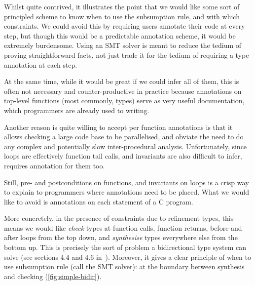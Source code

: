 Whilst quite contrived, it illustrates the point that we would like some sort
of principled scheme to know when to use the subsumption rule, and with which
constraints. We could avoid this by requiring users annotate their code at
every step, but though this would be a predictable annotation scheme, it would
be extremely burdensome. Using an SMT solver is meant to reduce the tedium of
proving straightforward facts, not just trade it for the tedium of requiring a
type annotation at each step.

At the same time, while it would be great if we could infer all of them, this
is often not necessary and counter-productive in practice because annotations
on top-level functions (most commonly, types) serve as very useful
documentation, which programmers are already used to writing.

Another reason  is quite willing to accept per function annotations is
that it allows checking a large code base to be parallelised, and obviate the
need to do any complex and potentially slow inter-procedural analysis.
Unfortunately, since loops are effectively function tail calls, and invariants
are also difficult to infer,  requires annotation for them too.

Still, pre- and postconditions on functions, and invariants on loops is a crisp
way to explain to programmers where annotations need to be placed. What we
would like to avoid is annotations on each statement of a C program.

More concretely, in the presence of constraints due to refinement types, this
means we would like \emph{check} types at function calls, function returns,
before and after loops from the top down, and \emph{synthesise} types
everywhere else from the bottom up. This is precisely the sort of problem a
bidirectional type system can solve (see sections 4.4 and 4.6
in~). Moreover, it gives a clear principle of
when to use subsumption rule (call the SMT solver): at the boundary between
synthesis and checking (\cref{fig:simple-bidir}).

